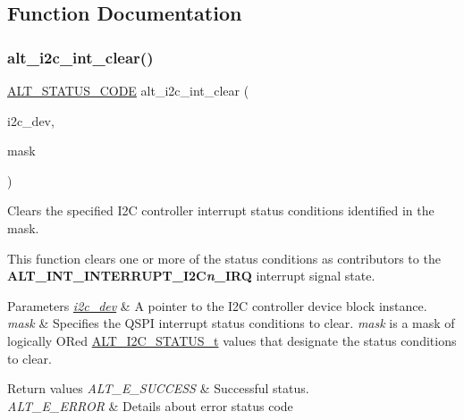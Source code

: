 \subsection{Function Documentation}
\mbox{\label{group__ALT__I2C__INT_gae00500b27051a82ff75905e777f0e1c8}} 
\subsubsection{\texorpdfstring{alt\_i2c\_int\_clear()}{alt\_i2c\_int\_clear()}}
{\footnotesize\ttfamily \mbox{\hyperlink{hwlib_8h_abdb0d369f069723ca55d6c94bcaaaa12}{A\+L\+T\+\_\+\+S\+T\+A\+T\+U\+S\+\_\+\+C\+O\+DE}} alt\+\_\+i2c\+\_\+int\+\_\+clear (\begin{DoxyParamCaption}\item[{\mbox{\hyperlink{structALT__I2C__DEV__s}{A\+L\+T\+\_\+\+I2\+C\+\_\+\+D\+E\+V\+\_\+t}} $\ast$}]{i2c\+\_\+dev,  }\item[{const uint32\+\_\+t}]{mask }\end{DoxyParamCaption})}

Clears the specified I2C controller interrupt status conditions identified in the mask.

This function clears one or more of the status conditions as contributors to the {\bfseries{A\+L\+T\+\_\+\+I\+N\+T\+\_\+\+I\+N\+T\+E\+R\+R\+U\+P\+T\+\_\+\+I2C{\itshape n}\+\_\+\+I\+RQ}} interrupt signal state.


\begin{DoxyParams}{Parameters}
{\em \mbox{\hyperlink{structi2c__dev}{i2c\+\_\+dev}}} & A pointer to the I2C controller device block instance.\\
\hline
{\em mask} & Specifies the Q\+S\+PI interrupt status conditions to clear. {\itshape mask} is a mask of logically OR\textquotesingle{}ed \mbox{\hyperlink{group__ALT__I2C_gaff6fbc8f47536dd27035588f0ea138fe}{A\+L\+T\+\_\+\+I2\+C\+\_\+\+S\+T\+A\+T\+U\+S\+\_\+t}} values that designate the status conditions to clear.\\
\hline
\end{DoxyParams}

\begin{DoxyRetVals}{Return values}
{\em A\+L\+T\+\_\+\+E\+\_\+\+S\+U\+C\+C\+E\+SS} & Successful status. \\
\hline
{\em A\+L\+T\+\_\+\+E\+\_\+\+E\+R\+R\+OR} & Details about error status code \\
\hline
\end{DoxyRetVals}
\mbox{\label{group__ALT__I2C__INT_gae81d1d1af98f385fd6202d382af93ecc}} 

